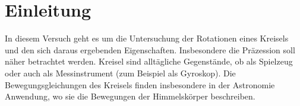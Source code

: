 \section{Einleitung}
In diesem Versuch geht es um die Untersuchung der Rotationen eines Kreisels und den sich daraus ergebenden Eigenschaften. Insbesondere die Präzession soll näher betrachtet werden. Kreisel sind alltägliche Gegenstände, ob als Spielzeug oder auch als Messinstrument (zum Beispiel als Gyroskop). Die Bewegungsgleichungen des Kreisels finden insbesondere in der Astronomie Anwendung, wo sie die Bewegungen der Himmelskörper beschreiben.